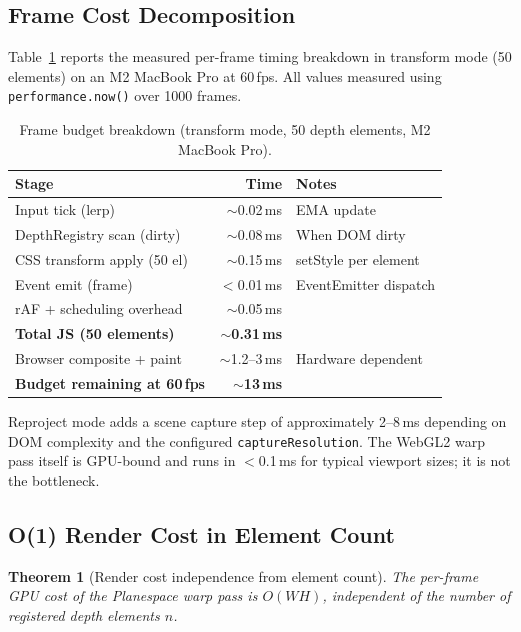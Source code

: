 \documentclass[10pt,twocolumn]{article}
\newtheorem{theorem}{Theorem}[section]
\begin{document}
\subsection{Frame Cost Decomposition}

Table~\ref{tab:timing} reports the measured per-frame timing breakdown in
transform mode (50 elements) on an M2 MacBook Pro at 60\,fps. All values
measured using \texttt{performance.now()} over 1000 frames.

\begin{table}[h]
\centering
\caption{Frame budget breakdown (transform mode, 50 depth elements, M2 MacBook Pro).}
\label{tab:timing}
\begin{tabular}{lrl}
\toprule
Stage & Time & Notes \\
\midrule
Input tick (lerp) & $\sim$0.02\,ms & EMA update \\
DepthRegistry scan (dirty) & $\sim$0.08\,ms & When DOM dirty \\
CSS transform apply (50 el) & $\sim$0.15\,ms & setStyle per element \\
Event emit (frame) & $<$0.01\,ms & EventEmitter dispatch \\
rAF + scheduling overhead & $\sim$0.05\,ms & \\
\midrule
\textbf{Total JS (50 elements)} & $\sim$\textbf{0.31\,ms} & \\
Browser composite + paint & $\sim$1.2--3\,ms & Hardware dependent \\
\textbf{Budget remaining at 60\,fps} & $\sim$\textbf{13\,ms} & \\
\bottomrule
\end{tabular}
\end{table}

Reproject mode adds a scene capture step of approximately 2--8\,ms depending
on DOM complexity and the configured \texttt{captureResolution}. The
WebGL2 warp pass itself is GPU-bound and runs in $<$0.1\,ms for typical
viewport sizes; it is not the bottleneck.

\subsection{O(1) Render Cost in Element Count}

\begin{theorem}[Render cost independence from element count]
\label{thm:cost}
The per-frame GPU cost of the Planespace warp pass is $O(WH)$, independent
of the number of registered depth elements $n$.
\end{theorem}
\end{document}
